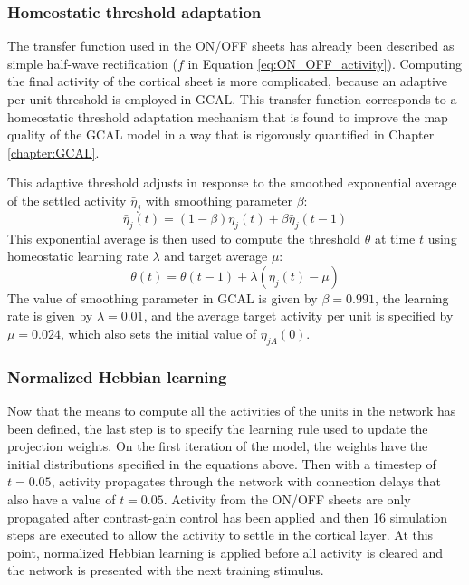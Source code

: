 \documentclass[phd,ianc,twoside]{infthesis}
\begin{document}
\subsubsection*{Homeostatic threshold adaptation}

The transfer function used in the ON/OFF sheets has already been
described as simple half-wave rectification ($f$ in Equation
\ref{eq:ON_OFF_activity}). Computing the final activity of the cortical
sheet is more complicated, because an adaptive per-unit threshold is employed
in GCAL. This transfer function corresponds to a homeostatic threshold
adaptation mechanism that is found to improve the map quality of the
GCAL model in a way that is rigorously quantified in Chapter
\ref{chapter:GCAL}.

This adaptive threshold adjusts in response to the smoothed exponential
average of the settled activity $\bar{\eta}_j$ with smoothing parameter
$\beta$:
\begin{equation}
  \label{eq:exponential_avg}
  \bar{\eta}_j(t) = (1 - \beta) \eta_j (t) + \beta \bar{\eta}_j (t - 1)
\end{equation}
This exponential average is then used to compute the threshold $\theta$
at time $t$ using homeostatic learning rate $\lambda$ and target average
$\mu$:
\begin{equation}
  \label{eq:adaptation}
  \theta (t) = \theta (t - 1) + \lambda ( \bar{\eta}_j (t) - \mu)
\end{equation}
The value of smoothing parameter in GCAL is given by $\beta=0.991$, the
learning rate is given by $\lambda=0.01$, and the average target
activity per unit is specified by $\mu=0.024$, which also sets the
initial value of $\bar{\eta}_{jA}(0)$.

\subsubsection*{Normalized Hebbian learning}

Now that the means to compute all the activities of the units in the
network has been defined, the last step is to specify the learning rule
used to update the projection weights. On the first iteration of the
model, the weights have the initial distributions specified in the
equations above. Then with a timestep of $t=0.05$, activity propagates
through the network with connection delays that also have a value of
$t=0.05$. Activity from the ON/OFF sheets are only propagated after
contrast-gain control has been applied and then 16 simulation steps are
executed to allow the activity to settle in the cortical layer. At
this point, normalized Hebbian learning is applied before all activity
is cleared and the network is presented with the next training stimulus.
\end{document}
